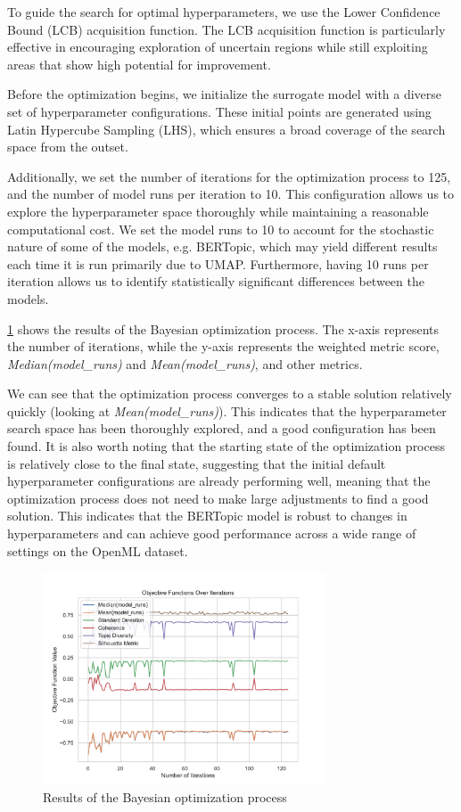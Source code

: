 To guide the search for optimal hyperparameters, we use the Lower Confidence Bound (LCB) acquisition function. The LCB acquisition function is particularly effective in encouraging exploration of uncertain regions while still exploiting areas that show high potential for improvement.

Before the optimization begins, we initialize the surrogate model with a diverse set of hyperparameter configurations. These initial points are generated using Latin Hypercube Sampling (LHS), which ensures a broad coverage of the search space from the outset.

Additionally, we set the number of iterations for the optimization process to 125, and the number of model runs per iteration to 10. This configuration allows us to explore the hyperparameter space thoroughly while maintaining a reasonable computational cost. We set the model runs to 10 to account for the stochastic nature of some of the models, e.g. BERTopic, which may yield different results each time it is run primarily due to UMAP. Furthermore, having 10 runs per iteration allows us to identify statistically significant differences between the models.

\cref{fig:bayesian_optimization} shows the results of the Bayesian optimization process. The x-axis represents the number of iterations, while the y-axis represents the weighted metric score, \textit{Median(model\_runs)} and \textit{Mean(model\_runs)}, and other metrics. 

We can see that the optimization process converges to a stable solution relatively quickly (looking at \textit{Mean(model\_runs)}). This indicates that the hyperparameter search space has been thoroughly explored, and a good configuration has been found. It is also worth noting that the starting state of the optimization process is relatively close to the final state, suggesting that the initial default hyperparameter configurations are already performing well, meaning that the optimization process does not need to make large adjustments to find a good solution. This indicates that the BERTopic model is robust to changes in hyperparameters and can achieve good performance across a wide range of settings on the OpenML dataset.

\begin{figure}[h]
    \centering
    \includegraphics[width=0.75\textwidth]{figures/bayesian_optimization.pdf}
    \caption{Results of the Bayesian optimization process}
    \label{fig:bayesian_optimization}
\end{figure}

